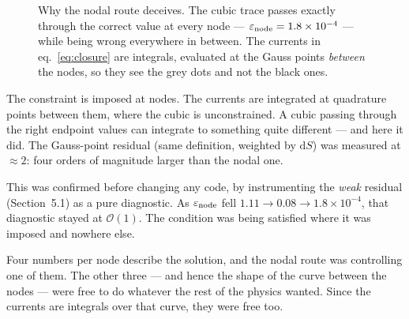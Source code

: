 \documentclass[11pt,a4paper]{article}
\newcommand{\zj}{z_j}
\newcommand{\zjsh}{z^{\mathrm{sh}}_{j}}
\newcommand{\dd}{\mathrm{d}}
\begin{document}
\begin{figure}[h]\centering
{}
\caption{Why the nodal route deceives. The cubic trace passes exactly through the correct value at
every node --- $\varepsilon_{\rm node}=1.8\times10^{-4}$ --- while being wrong everywhere in between.
The currents in eq.~\eqref{eq:closure} are integrals, evaluated at the Gauss points \emph{between}
the nodes, so they see the grey dots and not the black ones.}
\label{fig:whyfail}
\end{figure}

The constraint is imposed at nodes. The currents are integrated at quadrature points between them,
where the cubic is unconstrained. A cubic passing through the right endpoint values can integrate to
something quite different --- and here it did. The Gauss-point residual (same definition, weighted by
$\dd S$) was measured at $\approx2$: four orders of magnitude larger than the nodal one.

This was confirmed before changing any code, by instrumenting the \emph{weak} residual (Section~5.1)
as a pure diagnostic. As $\varepsilon_{\rm node}$ fell $1.11\to0.08\to1.8\times10^{-4}$, that
diagnostic stayed at $\mathcal{O}(1)$. The condition was being satisfied where it was imposed and
nowhere else.

\begin{plain}
Four numbers per node describe the solution, and the nodal route was controlling one of them. The
other three --- and hence the shape of the curve between the nodes --- were free to do whatever the
rest of the physics wanted. Since the currents are integrals over that curve, they were free too.
\end{plain}
\end{document}
